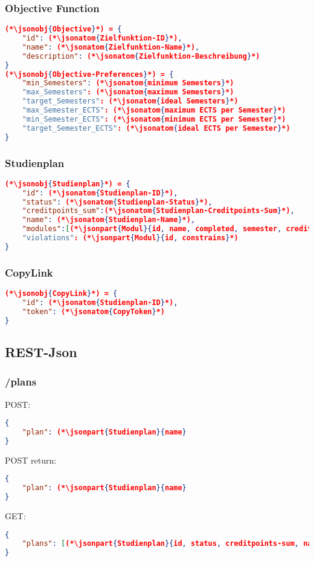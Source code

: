 \subsubsection{Objective Function}
\begin{lstlisting}[language=json,firstnumber=1]
(*\jsonobj{Objective}*) = {
	"id": (*\jsonatom{Zielfunktion-ID}*),
	"name": (*\jsonatom{Zielfunktion-Name}*),
	"description": (*\jsonatom{Zielfunktion-Beschreibung}*)
}
(*\jsonobj{Objective-Preferences}*) = {
	"min_Semesters": (*\jsonatom{minimum Semesters}*)
	"max_Semesters": (*\jsonatom{maximum Semesters}*)
	"target_Semesters": (*\jsonatom{ideal Semesters}*)
	"max_Semester_ECTS": (*\jsonatom{maximum ECTS per Semester}*)
	"min_Semester_ECTS": (*\jsonatom{minimum ECTS per Semester}*)
	"target_Semester_ECTS": (*\jsonatom{ideal ECTS per Semester}*)
}
\end{lstlisting}

\subsubsection{Studienplan}
\begin{lstlisting}[language=json,firstnumber=1]
(*\jsonobj{Studienplan}*) = {
	"id": (*\jsonatom{Studienplan-ID}*),
	"status": (*\jsonatom{Studienplan-Status}*),
	"creditpoints_sum":(*\jsonatom{Studienplan-Creditpoints-Sum}*),
	"name": (*\jsonatom{Studienplan-Name}*),
	"modules":[(*\jsonpart{Modul}{id, name, completed, semester, creditpoints, lecturer}*), ...]
	"violations": (*\jsonpart{Modul}{id, constrains}*)	
}
\end{lstlisting}

\subsubsection{CopyLink}
\begin{lstlisting}[language=json,firstnumber=1]
(*\jsonobj{CopyLink}*) = {
	"id": (*\jsonatom{Studienplan-ID}*),
	"token": (*\jsonatom{CopyToken}*)
}
\end{lstlisting}


\subsection{REST-Json}

\subsubsection{/plans}
POST:
\begin{lstlisting}[language=json,firstnumber=1]
{
	"plan": (*\jsonpart{Studienplan}{name}
}
\end{lstlisting}
POST return:
\begin{lstlisting}[language=json,firstnumber=1]
{
	"plan": (*\jsonpart{Studienplan}{name}
}
\end{lstlisting}
GET:
\begin{lstlisting}[language=json,firstnumber=1]
{
	"plans": [(*\jsonpart{Studienplan}{id, status, creditpoints-sum, name}*), ...]
}
\end{lstlisting}

